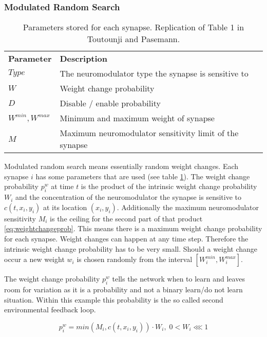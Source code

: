 \documentclass[12pt,twoside]{scrartcl}
\theoremstyle{plain}
\theoremstyle{definition}
\theoremstyle{remark}
\begin{document}
\subsubsection*{Modulated Random Search}

\begin{table}
    \begin{tabular}{l|l}
        \textbf{Parameter} & \textbf{Description} \\
        \(Type\) & The neuromodulator type the synapse is sensitive to \\
        \(W\) & Weight change probability \\
        \(D\) & Disable / enable probability \\
        \(W^{min}, W^{max}\) & Minimum and maximum weight of synapse \\
        \(M\) & Maximum neuromodulator sensitivity limit of the synapse
    \end{tabular}
    \caption{Parameters stored for each synapse.
    Replication of Table 1 in Toutounji and Pasemann\cite{Toutounji2016}.}
    \label{tab:mrs-synapse}
\end{table}

Modulated random search means essentially random weight changes. Each synapse \(i\)
has some parameters that are used (see table \ref{tab:mrs-synapse}). The weight
change probability \(p_i^w\) at time \(t\) is the product of the intrinsic weight
change probability \(W_i\) and the concentration of the neuromodulator the synapse
is sensitive to \(c(t, x_i, y_i)\) at its location \((x_i, y_i)\). Additionally
the maximum neuromodulator sensitivity \(M_i\) is the ceiling for the second part
of that product \eqref{eq:weightchangeprob}. This means there is a maximum weight
change probability for each synapse. Weight changes can happen at any time step.
Therefore the intrinsic weight change probability has to be very small. Should a
weight change occur a new weight \(w_i\) is chosen randomly from the interval
\([W_i^{min}, W_i^{max}]\).

The weight change probability \(p_i^w\) tells the network when to learn and leaves
room for variation as it is a probability and not a binary learn/do not learn
situation. Within this example this probability is the so called second environmental
feedback loop.

\begin{equation}\label{eq:weightchangeprob}
    p_i^w = min(M_i, c(t, x_i, y_i)) \cdot W_i,\; 0 < W_i \lll 1
\end{equation}
\end{document}
